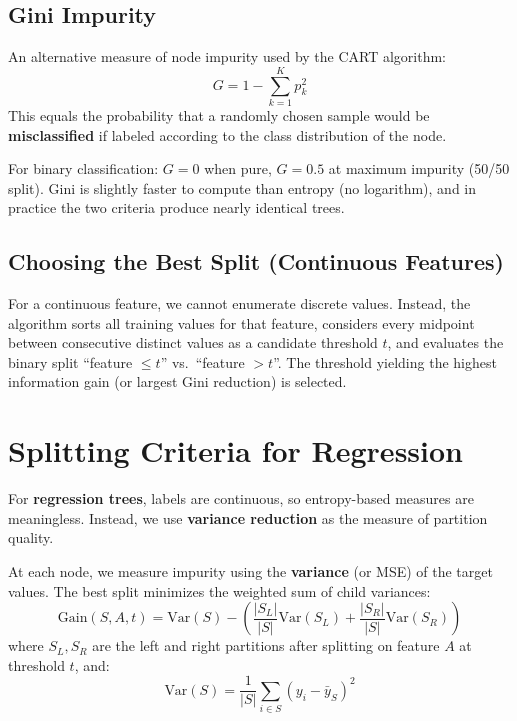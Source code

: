 \subsection*{Gini Impurity}

\begin{definition}
An alternative measure of node impurity used by the CART algorithm:
$$G = 1 - \sum_{k=1}^{K} p_k^2$$
This equals the probability that a randomly chosen sample would be \textbf{misclassified} if labeled according to the class distribution of the node.
\end{definition}

For binary classification: $G = 0$ when pure, $G = 0.5$ at maximum impurity (50/50 split). Gini is slightly faster to compute than entropy (no logarithm), and in practice the two criteria produce nearly identical trees.

\subsection*{Choosing the Best Split (Continuous Features)}

For a continuous feature, we cannot enumerate discrete values. Instead, the algorithm sorts all training values for that feature, considers every midpoint between consecutive distinct values as a candidate threshold $t$, and evaluates the binary split ``feature $\leq t$'' vs.\ ``feature $> t$''. The threshold yielding the highest information gain (or largest Gini reduction) is selected.

\section*{Splitting Criteria for Regression}

For \textbf{regression trees}, labels are continuous, so entropy-based measures are meaningless. Instead, we use \textbf{variance reduction} as the measure of partition quality.

\begin{definition}
At each node, we measure impurity using the \textbf{variance} (or MSE) of the target values. The best split minimizes the weighted sum of child variances:
$$\text{Gain}(S, A, t) = \text{Var}(S) - \left(\frac{|S_L|}{|S|}\text{Var}(S_L) + \frac{|S_R|}{|S|}\text{Var}(S_R)\right)$$
where $S_L, S_R$ are the left and right partitions after splitting on feature $A$ at threshold $t$, and:
$$\text{Var}(S) = \frac{1}{|S|}\sum_{i \in S}(y_i - \bar{y}_S)^2$$
\end{definition}

